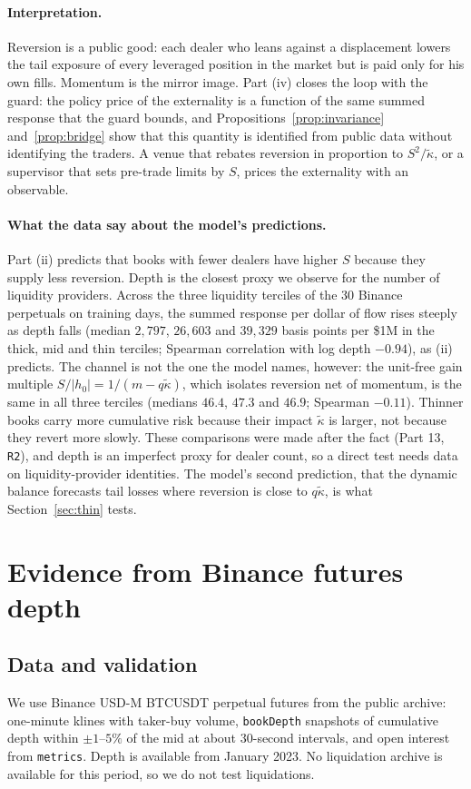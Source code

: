 \documentclass[12pt]{article}
\theoremstyle{definition}
\theoremstyle{remark}
\begin{document}
\paragraph{Interpretation.} Reversion is a public good: each dealer who leans against a displacement lowers the tail exposure of every leveraged position in the market but is paid only for his own fills. Momentum is the mirror image. Part (iv) closes the loop with the guard: the policy price of the externality is a function of the same summed response that the guard bounds, and Propositions~\ref{prop:invariance} and~\ref{prop:bridge} show that this quantity is identified from public data without identifying the traders. A venue that rebates reversion in proportion to $S^2/\tilde\kappa$, or a supervisor that sets pre-trade limits by $S$, prices the externality with an observable.

\paragraph{What the data say about the model's predictions.} Part (ii) predicts that books with fewer dealers have higher $S$ because they supply less reversion. Depth is the closest proxy we observe for the number of liquidity providers. Across the three liquidity terciles of the 30 Binance perpetuals on training days, the summed response per dollar of flow rises steeply as depth falls (median $2{,}797$, $26{,}603$ and $39{,}329$ basis points per \$1M in the thick, mid and thin terciles; Spearman correlation with log depth $-0.94$), as (ii) predicts. The channel is not the one the model names, however: the unit-free gain multiple $S/|h_0|=1/(m-q\tilde\kappa)$, which isolates reversion net of momentum, is the same in all three terciles (medians $46.4$, $47.3$ and $46.9$; Spearman $-0.11$). Thinner books carry more cumulative risk because their impact $\tilde\kappa$ is larger, not because they revert more slowly. These comparisons were made after the fact (Part 13, \texttt{R2}), and depth is an imperfect proxy for dealer count, so a direct test needs data on liquidity-provider identities. The model's second prediction, that the dynamic balance forecasts tail losses where reversion is close to $q\tilde\kappa$, is what Section~\ref{sec:thin} tests.
\section{Evidence from Binance futures depth}\label{sec:depth}

\subsection{Data and validation}
We use Binance USD-M BTCUSDT perpetual futures from the public archive: one-minute klines with taker-buy volume, \texttt{bookDepth} snapshots of cumulative depth within $\pm1$--$5\%$ of the mid at about 30-second intervals, and open interest from \texttt{metrics}. Depth is available from January 2023. No liquidation archive is available for this period, so we do not test liquidations.
\end{document}
